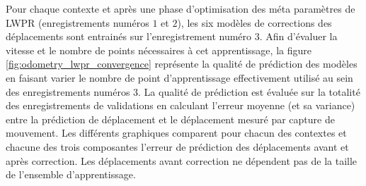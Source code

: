 Pour chaque contexte et après une phase d'optimisation des méta paramètres de LWPR 
(enregistrements numéros $1$ et $2$), les six
modèles de corrections des déplacements sont entrainés sur l'enregistrement numéro $3$.
Afin d'évaluer la vitesse et le nombre de points nécessaires à cet apprentissage, 
la figure \ref{fig:odometry_lwpr_convergence} représente la qualité de prédiction des modèles
en faisant varier le nombre de point d'apprentissage effectivement utilisé 
au sein des enregistrements numéros $3$.
La qualité de prédiction est évaluée sur la totalité des enregistrements de validations en calculant
l'erreur moyenne (et sa variance) entre la prédiction de déplacement et le déplacement mesuré 
par capture de mouvement.
Les différents graphiques comparent pour chacun des contextes et chacune des trois composantes
l'erreur de prédiction des déplacements avant et après correction.
Les déplacements avant correction ne dépendent pas de la taille de l'ensemble d'apprentissage.

